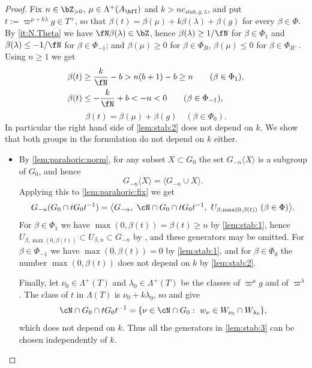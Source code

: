 \documentclass[12pt,a4paper]{amsart}%
\begin{document}
\begin{proof}
Fix $n\in\Z_{>0}$, $\mu\in\Lambda^+(A_\bfT)$ and $k>nc_{stab,g,\lambda}$, and put $t:=\varpi^{\mu+k\lambda}g\in T^+$, so that
$\beta(t)=\beta(\mu)+k\beta(\lambda)+\beta(g)$ for every $\beta\in\Phi$. By \eqref{it:N.Theta} we have $\fN\beta(\lambda)\in\Z$, hence $\beta(\lambda)\geq 1/\fN$ for $\beta\in\Phi_1$ and $\beta(\lambda)\leq -1/\fN$ for $\beta\in\Phi_{-1}$; and $\beta(\mu)\geq0$ for $\beta\in\Phi_B$, $\beta(\mu)\leq 0$ for $\beta\in \Phi_{B^-}$. Using $n\geq1$ we get
\begin{equation}\label{lem:stab:1}
\begin{split}
\beta(t)&\geq \frac{k}{\fN}-b>n(b+1)-b\geq n\qquad(\beta\in\Phi_1),\\
\beta(t)&\leq -\frac{k}{\fN}+b<-n<0\qquad(\beta\in\Phi_{-1}),
\end{split}
\end{equation}
\begin{equation}\label{lem:stab:2}
\beta(t)=\beta(\mu)+\beta(g)\quad(\beta\in\Phi_0).
\end{equation}
In particular the right hand side of \eqref{lem:stab:2} does not depend on $k$. We show that both groups in the formulation do not depend on $k$ either.
\begin{itemize}
    \item[\eqref{lem:stab:G0}]
By \eqref{lem:parahoric:norm}, for any subset $X\subset G_0$ the set $G_{-n}\langle X\rangle$ is a subgroup of $G_0$, and hence
$$G_{-n}\langle X\rangle=\langle G_{-n}\cup X\rangle .$$
Applying this to \eqref{lem:parahoric:fix} we get
\begin{equation}\label{lem:stab:3}
G_{-n}(G_0\cap tG_0t^{-1})=\bigl\langle G_{-n},\ \cN\cap G_0\cap tG_0t^{-1},\ U_{\beta,\max(0,\beta(t))}\ (\beta\in\Phi)\bigr\rangle .
\end{equation}
For $\beta\in\Phi_1$ we have $\max(0,\beta(t))=\beta(t)\geq n$ by \eqref{lem:stab:1}, hence
$U_{\beta,\max(0,\beta(t))}\subset U_{\beta,n}\subset G_{-n}$ by , and these generators may be omitted. For $\beta\in\Phi_{-1}$ we have $\max(0,\beta(t))=0$ by \eqref{lem:stab:1}, and for $\beta\in\Phi_0$ the number $\max(0,\beta(t))$ does not depend on $k$ by \eqref{lem:stab:2}.

Finally, let $\nu_0\in\Lambda^+(T)$ and $\lambda_0\in\Lambda^+(T)$ be the classes of $\varpi^{\mu}g$ and of $\varpi^{\lambda}$. The class of $t$ in $\Lambda(T)$ is $\nu_0+k\lambda_0$, so  and  give
$$\cN\cap G_0\cap tG_0t^{-1}=\{\nu\in\cN\cap G_0:\ w_\nu\in W_{\nu_0}\cap W_{\lambda_0}\},$$
which does not depend on $k$. Thus all the generators in \eqref{lem:stab:3} can be chosen independently of $k$.


\end{itemize}
\end{proof}
\end{document}
